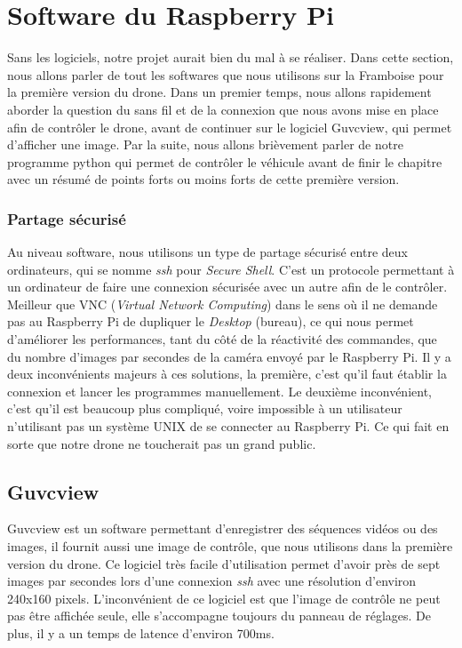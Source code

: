 \documentclass[a4paper,11pt]{report}
\begin{document}
{\section{Software du Raspberry Pi}

Sans les logiciels, notre projet aurait bien du mal à se réaliser. Dans cette section, nous allons parler de tout les softwares que nous utilisons sur la Framboise pour la première version du drone. Dans un premier temps, nous allons rapidement aborder la question du sans fil et de la connexion que nous avons mise en place afin de contrôler le drone, avant de continuer sur le logiciel Guvcview, qui permet d'afficher une image. Par la suite, nous allons brièvement parler de notre programme python qui permet de contrôler le véhicule avant de finir le chapitre avec un résumé de points forts ou moins forts de cette première version.





\subsubsection{Partage sécurisé}

Au niveau software, nous utilisons un type de partage sécurisé entre deux ordinateurs, qui se nomme \textit{ssh} pour \textit{Secure Shell}. C'est un protocole permettant à un ordinateur de faire une connexion sécurisée avec un autre afin de le contrôler. Meilleur que VNC (\textit{Virtual Network Computing}) dans le sens où il ne demande pas au Raspberry Pi de dupliquer le \textit{Desktop} (bureau), ce qui nous permet d'améliorer les performances, tant du côté de la réactivité des commandes, que du nombre d'images par secondes de la caméra envoyé par le Raspberry Pi. Il y a deux inconvénients majeurs à ces solutions, la première, c'est qu'il faut établir la connexion et lancer les programmes manuellement. Le deuxième inconvénient, c'est qu'il est beaucoup plus compliqué, voire impossible à un utilisateur n'utilisant pas un système UNIX de se connecter au Raspberry Pi. Ce qui fait en sorte que notre drone ne toucherait pas un grand public.

\subsection{Guvcview}

Guvcview\label{Guvcview} est un software permettant d'enregistrer des séquences vidéos ou des images, il fournit aussi une image de contrôle, que nous utilisons dans la première version du drone. Ce logiciel très facile d'utilisation permet d'avoir près de sept images par secondes lors d'une connexion \textit{ssh} avec une résolution d'environ 240x160 pixels. L'inconvénient de ce logiciel est que l'image de contrôle ne peut pas être affichée seule, elle s'accompagne toujours du panneau de réglages. De plus, il y a un temps de latence d'environ 700ms. 

}
\end{document}
